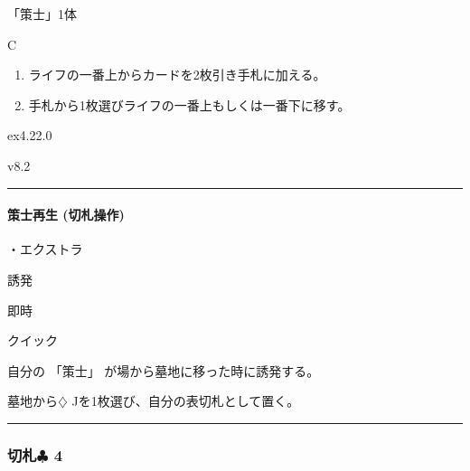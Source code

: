 \documentclass[letterpaper,10pt,dvipdfmx]{sphinxmanual}
\begin{document}
\sphinxAtStartPar
{} 「策士」1体

\sphinxAtStartPar
{} C

\sphinxAtStartPar
{}
\begin{enumerate}
%
\item {} 
\sphinxAtStartPar
ライフの一番上からカードを2枚引き手札に加える。

\item {} 
\sphinxAtStartPar
手札から1枚選びライフの一番上もしくは一番下に移す。

\end{enumerate}

\sphinxAtStartPar
{}  ex4.22.0

\sphinxAtStartPar
{}  v8.2


\bigskip\hrule\bigskip



\paragraph{策士再生 (切札操作)}
\label{\detokenize{auto/frameActionlist:act-strategistrevive}}\label{\detokenize{auto/frameActionlist:id68}}
\sphinxAtStartPar
{}

\sphinxAtStartPar
・エクストラ

\sphinxAtStartPar
{} 誘発

\sphinxAtStartPar
{} 即時

\sphinxAtStartPar
{} クイック

\sphinxAtStartPar
{}

\sphinxAtStartPar
自分の 「策士」 が場から墓地に移った時に誘発する。

\sphinxAtStartPar
{}

\sphinxAtStartPar
墓地から{\normalsize $\diamondsuit$} Jを1枚選び、自分の表切札として置く。


\bigskip\hrule\bigskip



\subsubsection{切札{\normalsize $\clubsuit$} 4}
\label{\detokenize{auto/frameActionlist:id69}}
\end{document}
